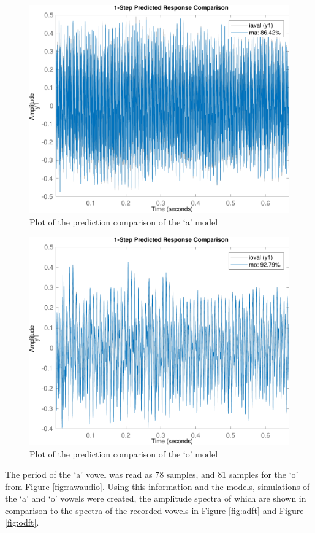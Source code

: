 \documentclass{IEEEtran}
\begin{document}
\begin{figure}[h!]
    \centering
    \captionsetup{justification=centering}
    \includegraphics[width=0.8\columnwidth]{pictures/compare_a.pdf}
    \caption{Plot of the prediction comparison of the `a' model}
    \label{fig:comparea}
\end{figure}

\begin{figure}[h!]
    \centering
    \captionsetup{justification=centering}
    \includegraphics[width=0.8\columnwidth]{pictures/compare_o.pdf}
    \caption{Plot of the prediction comparison of the `o' model}
    \label{fig:compareo}
\end{figure}

The period of the `a' vowel was read as 78 samples, and 81 samples for the `o'
from Figure \ref{fig:rawaudio}. Using this information and the models,
simulations of the `a' and `o' vowels were created, the amplitude spectra of
which are shown in comparison to the spectra of the recorded vowels in Figure
\ref{fig:adft} and Figure \ref{fig:odft}.
\end{document}
